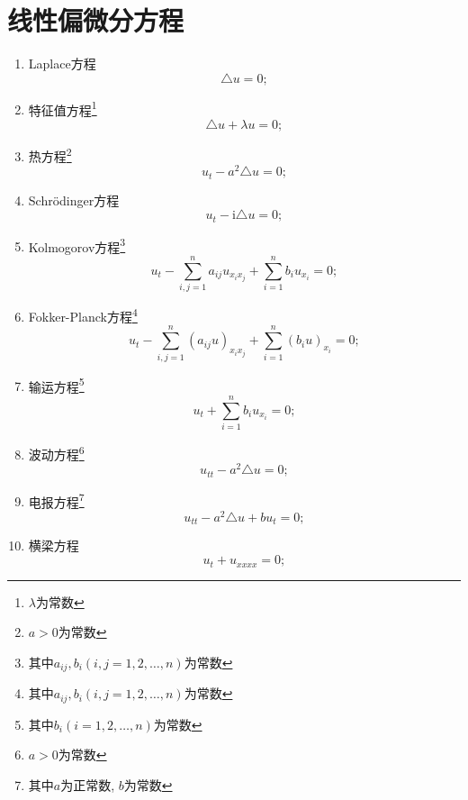 \documentclass{ctexart}
\newcommand{\I}{\mathrm{i}}
\begin{document}
\section{线性偏微分方程}
    \begin{enumerate}
        \item Laplace方程
            \[
            \triangle u = 0;
            \]
        \item 特征值方程\footnote{$\lambda$为常数}
            \[
            \triangle u + \lambda u = 0;
            \]
        \item 热方程\footnote{$a>0$为常数}
            \[
            u_t - a^2\triangle u = 0;
            \]
        \item Schrödinger方程
            \[
            u_t - \I\triangle u = 0;
            \]
        \item Kolmogorov方程\footnote{其中$a_{ij},b_i(i,j=1,2,\ldots,n)$为常数}
            \[
            u_t - \sum_{i,j=1}^{n}a_{ij}u_{x_ix_j} + \sum_{i=1}^{n}b_iu_{x_i} = 0;
            \]
        \item Fokker-Planck方程\footnote{其中$a_{ij},b_i(i,j=1,2,\ldots,n)$为常数}
            \[
            u_t - \sum_{i,j=1}^{n}(a_{ij}u)_{x_ix_j} + \sum_{i=1}^{n}(b_iu)_{x_i} = 0;
            \]
        \item 输运方程\footnote{其中$b_i(i=1,2,\ldots,n)$为常数}
            \[
            u_t + \sum_{i=1}^{n}b_iu_{x_i} = 0;
            \]
        \item 波动方程\footnote{$a>0$为常数}
            \[
            u_{tt} - a^2\triangle u = 0;
            \]
        \item 电报方程\footnote{其中$a$为正常数, $b$为常数}
            \[
            u_{tt} - a^2\triangle u + bu_t = 0;
            \]
        \item 横梁方程
            \[
            u_t + u_{xxxx} = 0;
            \]
    \end{enumerate}
\end{document}
